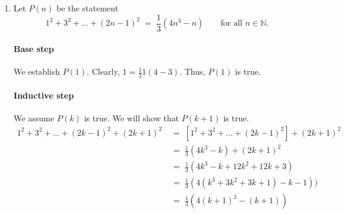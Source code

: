 \documentclass[10pt]{article}
\begin{document}
\begin{enumerate}
                \paragraph{Base step}
                We establish $P(1)$. Clearly, $1 = \frac{1}{6}1(1 + 1)(2 + 1)$. Thus, $P(1)$ is true.
                \paragraph{Inductive step}
                We assume $P(k)$ is true. We will show that $P(k + 1)$ is true.
                \begin{align*}
                        1^2 + 2^2 + \dots + k^2 + (k + 1)^2
                                \;&=\; [1^2 + 2^2 + \dots + k^2] + (k + 1)^2 \\
                                \;&=\; \frac{1}{6}k(k + 1)(2k + 1) + (k + 1)^2 \tag{From $P(k)$}\\
                                \;&=\; \frac{1}{6}(k + 1)(2k^2 + k + 6k + 6) \\
                                \;&=\; \frac{1}{6}(k + 1)(2k^2 + 7k + 6) \\
                                \;&=\; \frac{1}{6}(k + 1)(k + 2)(2k + 3) \\
                                \;&=\; \frac{1}{6}(k + 1)((k + 1) + 1)(2(k + 1) + 1)
                \end{align*}

                Hence, by the principle of mathematical induction, $P(n)$ is true for all $n \in \mathbb{N}$.\qed\\
                
                \item Let $P(n)$ be the statement
                \[1^2 + 3^2 + \dots + (2n - 1)^2 \;=\; \frac{1}{3}(4n^3 - n) \quad\quad\text{for all }n \in \mathbb{N}.\]
                \paragraph{Base step}
                We establish $P(1)$. Clearly, $1 = \frac{1}{3}1(4 - 3)$. Thus, $P(1)$ is true.
                \paragraph{Inductive step}
                We assume $P(k)$ is true. We will show that $P(k + 1)$ is true.
                \begin{align*}
                        1^2 + 3^2 + \dots + (2k - 1)^2 + (2k + 1)^2
                                \;&=\; [1^2 + 3^2 + \dots + (2k - 1)^2] + (2k + 1)^2 \\
                                \;&=\; \frac{1}{3}(4k^3 - k) + (2k + 1)^2 \tag{From $P(k)$}\\
                                \;&=\; \frac{1}{3}(4k^3 - k + 12k^2 + 12k + 3)\\
                                \;&=\; \frac{1}{3}(4(k^3 + 3k^2 + 3k + 1) - k - 1)) \\
                                \;&=\; \frac{1}{3}(4(k + 1)^3 - (k + 1))
                \end{align*}


\end{enumerate}
\end{document}
